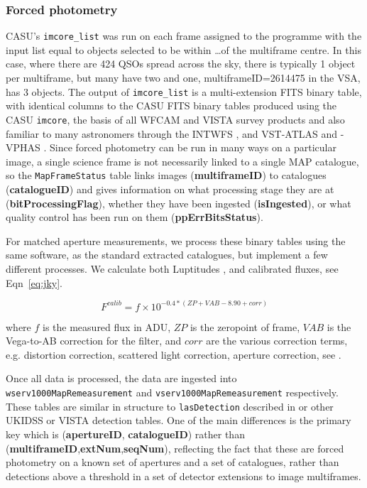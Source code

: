 \documentclass[usenatbib]{mnras}
\begin{document}
\subsubsection{Forced photometry}
CASU's \verb+imcore_list+ was run on each frame assigned to the programme with
the input list equal to objects selected to be within \ldots of the multiframe
centre. In this case, where there are 424 QSOs spread across the sky, there is
typically 1 object per multiframe, but many have two and one,
multiframeID=2614475 in the VSA, has 3 objects. The output of \verb+imcore_list+
is a multi-extension FITS binary table, with identical columns to the CASU FITS
binary tables produced using the CASU \verb+imcore+, the basis of all WFCAM and
VISTA survey products and also familiar to many astronomers through the INTWFS
\citep{}, and VST-ATLAS and -VPHAS \citep{}. Since forced photometry can be run
in many ways on a particular image, a single science frame is not
necessarily linked to a single MAP catalogue, so the \verb+MapFrameStatus+ table
links images ({\bf multiframeID}) to catalogues ({\bf catalogueID}) and gives
information on what processing stage they are at ({\bf bitProcessingFlag}),
whether they have been ingested ({\bf isIngested}), or what quality control has
been run on them ({\bf ppErrBitsStatus}).

For matched aperture measurements, we process these binary tables using the same
software, as the standard extracted catalogues, but implement a few different
processes. We calculate both Luptitudes \citep{Luptitudes}, and calibrated fluxes,
see Eqn~\ref{eq:jky}. 


\begin{equation}
F^{calib} = f\times10^{-0.4*(ZP+VAB-8.90+corr)} 
\label{eq:jky}
\end{equation}

\noindent where $f$ is the measured flux in ADU, $ZP$ is the zeropoint of
frame, $VAB$ is the Vega-to-AB correction for the filter, and $corr$ are the
various correction terms, e.g. distortion correction, scattered light
correction, aperture correction, see \citep{Hambly2008, Cross2012}. 

Once all data is processed, the data are ingested into
\verb+wserv1000MapRemeasurement+ and \verb+vserv1000MapRemeasurement+
respectively. These tables are similar in structure to \verb+lasDetection+
described in \citep{Hambly2008} or other UKIDSS or VISTA detection tables. One of
the main differences is the primary key which is ({\bf apertureID},{\bf
catalogueID}) rather than ({\bf multiframeID},{\bf extNum},{\bf seqNum}),
reflecting the fact that these are forced photometry on a known set of apertures
and a set of catalogues, rather than detections above a threshold in a set of
detector extensions to image multiframes.
\end{document}

